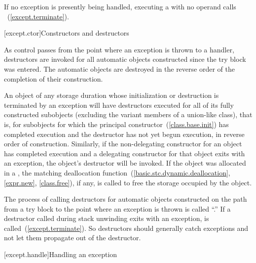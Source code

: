 \pnum
{}%
%
%
If no exception is presently being handled,
executing a
with no operand calls
~(\ref{except.terminate}).


[except.ctor]{Constructors and destructors}%
%
%
%

\pnum
As control passes from the point where an exception is thrown
to a handler,
destructors are invoked for all automatic objects constructed since the
try block was entered.
The automatic objects are destroyed in the reverse order of the completion
of their construction.

\pnum
An object
of any storage duration whose initialization or destruction is terminated by an exception
will have
destructors executed for all of its fully constructed
subobjects (excluding the variant members of a union-like class),
that is, for subobjects for which the principal
constructor~(\ref{class.base.init}) has completed execution
and the destructor has not yet begun execution,
in reverse order of construction.
Similarly, if the non-delegating constructor for an object has
completed execution and a delegating constructor for that object exits with
an exception, the object's destructor will be invoked.
If the object was allocated in a
,
the matching deallocation function~(\ref{basic.stc.dynamic.deallocation}, \ref{expr.new}, \ref{class.free}),
if any, is called to free the storage occupied by the
object.

\pnum
{}%
The process of calling destructors for automatic objects constructed on the
path from a try block to the point where an exception is thrown
is called
``.''
If a destructor called during stack unwinding exits with an exception,
is called~(\ref{except.terminate}).
\enternote
So destructors should generally catch
exceptions and not let them propagate out of the destructor.
\exitnote


[except.handle]{Handling an exception}
%

